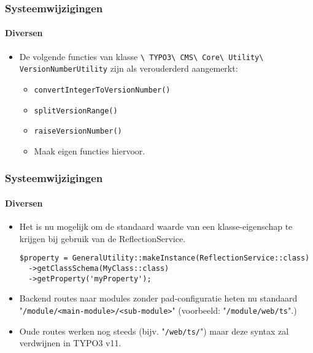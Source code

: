 \begin{frame}[fragile]
	\frametitle{Systeemwijzigingen}
	\framesubtitle{Diversen}

	\begin{itemize}

		\item De volgende functies van klasse
			\smaller\texttt{\textbackslash
				TYPO3\textbackslash
				CMS\textbackslash
				Core\textbackslash
				Utility\textbackslash
				VersionNumberUtility}\normalsize\newline
			zijn als verouderderd aangemerkt:

			\begin{itemize}
				\item \texttt{convertIntegerToVersionNumber()}
				\item \texttt{splitVersionRange()}
				\item \texttt{raiseVersionNumber()}
			\end{itemize}

			\begin{itemize}\smaller
				\item[\ding{228}] Maak eigen functies hiervoor.
			\end{itemize}\normalsize

	\end{itemize}

\end{frame}


\begin{frame}[fragile]
	\frametitle{Systeemwijzigingen}
	\framesubtitle{Diversen}

	\lstset{basicstyle=\tiny\ttfamily}

	\begin{itemize}
		\item Het is nu mogelijk om de standaard waarde van een klasse-eigenschap
			te krijgen bij gebruik van de ReflectionService.
\begin{lstlisting}
$property = GeneralUtility::makeInstance(ReflectionService::class)
  ->getClassSchema(MyClass::class)
  ->getProperty('myProperty');
\end{lstlisting}

		\item Backend routes naar modules zonder pad-configuratie heten nu\newline
			standaard "\texttt{/module/<main-module>/<sub-module>}"\newline
			\small
				(voorbeeld: "\texttt{/module/web/ts}".)
			\normalsize

		\item Oude routes werken nog steeds (bijv. "\texttt{/web/ts/}") maar deze syntax zal verdwijnen in TYPO3 v11.

	\end{itemize}

\end{frame}

